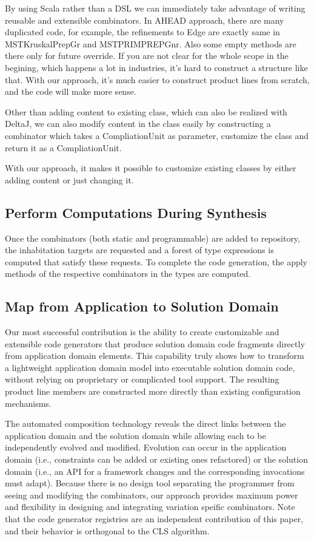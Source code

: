 By using Scala rather than a DSL we can immediately take advantage of writing reusable and extensible combinators.
In AHEAD approach, there are many duplicated code, for example, the refinements to Edge are exactly same in MSTKruskalPrepGr
 and MSTPRIMPREPGnr. Also some empty methods are there only for future override. If you are not clear for the whole
 scope in the begining, which happens a lot in industries, it's hard to construct a structure like that. With our
 approach, it's much easier to construct product lines from scratch, and the code will make more sense.

 Other than adding content to existing class, which can also be realized with DeltaJ, we can also modify content in the
 class easily by constructing a combinator which takes a CompliationUnit as parameter, customize the class and return it
 as a CompliationUnit.

 With our approach, it makes it possible to customize existing classes by either adding content or just changing it.


 \subsection{Perform Computations During Synthesis}

Once the combinators (both static and programmable) are added to repository, the inhabitation targets are requested
and a forest of type expressions is computed that satisfy these requests. To complete the code generation, the apply
methods of the respective combinators in the types are computed.


 \subsection{Map from Application to Solution Domain}

 Our most successful contribution is the ability to create customizable and extensible code generators that produce
 solution domain code fragments directly from application domain elements.
 This capability truly shows how to transform a lightweight application domain model into executable solution domain
 code, without relying on proprietary or complicated tool support. The resulting product line members are constructed
 more directly than existing configuration mechanisms.

 The automated composition technology reveals the direct links between the application domain and the solution
 domain while allowing each to be independently evolved and modified. Evolution can occur in the application domain
 (i.e., constraints can be added or existing ones refactored) or the solution domain (i.e., an API for a framework
 changes and the corresponding invocations must adapt). Because there is no design tool separating the programmer
 from seeing and modifying the combinators, our approach provides maximum power and flexibility in designing and
 integrating variation speific combinators. Note that the code generator registries are an independent contribution
 of this paper, and their behavior is orthogonal to the CLS algorithm.

